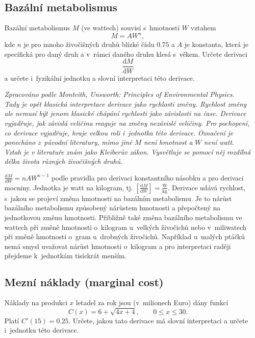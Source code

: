 \konec


\stranka

\subsection{Bazální metabolismus}
Bazální metabolismus $M$ (ve wattech) souvisí s hmotností $W$ vztahem
$$M=AW^n,$$ kde $n$ je pro mnoho živočišných druhů blízké číslu $0.75$ a
$A$ je konstanta, která je specifická pro daný druh a v rámci daného
druhu klesá s věkem. Určete derivaci $$\frac{\mathrm d M}{\mathrm dW}$$
a určete i fyzikální jednotku a slovní interpretaci této derivace.

\textit{Zpracováno podle Monteith, Unsworth: Principles of Environmental Physics. Tady je opět klasická interpretace derivace jako rychlosti změny. Rychlost změny ale nemusí být jenom klasické chápání rychlosti jako závislosti na čase. Derivace vyjadřuje, jak závislá veličina reaguje na změny nezávislé veličiny. Pro pochopení, co derivace vyjadřuje, hraje velkou roli i jednotka této derivace. Označení je ponecháno z původní literatury, mimo jiné $M$ není hmotnost a $W$ není watt. Vztah je v literatuře znám jako Kleiberův zákon. Vysvětluje se pomocí něj rozdílná délka života různých živočišných druhů.}

\reseni $\frac {\mathrm dM}{\mathrm dW}=nAW^{n-1}$ podle pravidla pro
derivaci konstantního násobku a pro derivaci mocniny. Jednotka je watt
na kilogram, tj.
$\left[\frac {\mathrm dM}{\mathrm dW}\right]=\frac{\mathrm W}{\mathrm
  {kg}}$. Derivace udává rychlost, s jakou se projeví změna hmotnosti na bazálním metabolismu. Je to nárůst bazálního metabolismu způsobený nárůstem hmotnosti a přepočtený na jednotkovou změnu hmotnosti. Přibližně také změna bazálního metabolismu ve wattech při změně hmotnosti o kilogram u velkých živočichů nebo v miliwatech při změně hmotnosti o gram u drobných živočichů. Například u malých ptáčků nemá smysl uvažovat nárůst hmotnosti o kilogram a pro interpretaci raději přejdeme k jednotkám tisíckrát menším.\konec



\stranka{}
\subsection{Mezní náklady (marginal cost)}
 Náklady na produkci $x$ letadel za rok jsou (v~milionech
Euro) dány funkcí
$$C(x) = 6 + \sqrt{4x + 4},\qquad  0 \leq x \leq 30.$$
Platí $C'(15)=0.25$. Určete, jakou tato derivace má slovní
interpretaci a určete i~jednotku této derivace.

